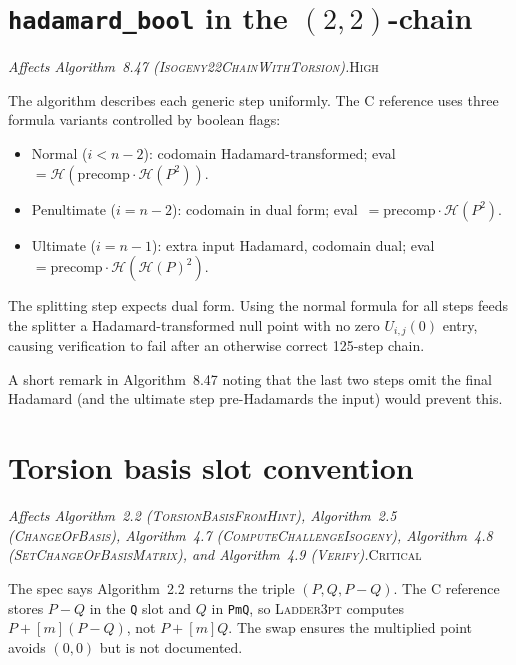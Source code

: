 \documentclass[a4paper,11pt]{article}
\newcommand{\algo}[1]{Algorithm~#1}
\newcommand{\critical}{\textsc{\color{BrickRed}Critical}}
\newcommand{\high}{\textsc{\color{BurntOrange}High}}
\newcommand{\finding}[2]{\noindent\textit{#1}\hfill#2\par\smallskip}
\begin{document}
\section{\texttt{hadamard\_bool} in the $(2,2)$-chain}
\label{sec:hadamard-bool}

\finding{Affects \algo{8.47}
(\textsc{Isogeny22ChainWithTorsion}).}{\high}

The algorithm describes each generic step uniformly.  The C reference
uses three formula variants controlled by boolean flags:
\begin{itemize}[nosep]
  \item Normal ($i < n{-}2$): codomain Hadamard-transformed;
        eval~$= \mathcal{H}(\mathrm{precomp} \cdot \mathcal{H}(P^2))$.
  \item Penultimate ($i = n{-}2$): codomain in dual form;
        eval~$= \mathrm{precomp} \cdot \mathcal{H}(P^2)$.
  \item Ultimate ($i = n{-}1$): extra input Hadamard, codomain dual;
        eval~$= \mathrm{precomp} \cdot \mathcal{H}(\mathcal{H}(P)^2)$.
\end{itemize}
The splitting step expects dual form.  Using the normal formula for all
steps feeds the splitter a Hadamard-transformed null point with no zero
$U_{i,j}(0)$ entry, causing verification to fail after an otherwise
correct 125-step chain.

A short remark in \algo{8.47} noting that the last two steps omit the
final Hadamard (and the ultimate step pre-Hadamards the input) would
prevent this.

\section{Torsion basis slot convention}
\label{sec:basis-swap}

\finding{Affects \algo{2.2}
(\textsc{TorsionBasisFromHint}), \algo{2.5}
(\textsc{ChangeOfBasis}), \algo{4.7}
(\textsc{ComputeChallengeIsogeny}), \algo{4.8}
(\textsc{SetChangeOfBasisMatrix}), and \algo{4.9}
(\textsc{Verify}).}{\critical}

The spec says \algo{2.2} returns the triple $(P, Q, P{-}Q)$.  The C
reference stores $P{-}Q$ in the \texttt{Q} slot and $Q$ in \texttt{PmQ},
so \textsc{Ladder3pt} computes $P + [m](P{-}Q)$, not $P + [m]Q$.  The
swap ensures the multiplied point avoids $(0,0)$ but is not documented.
\end{document}
